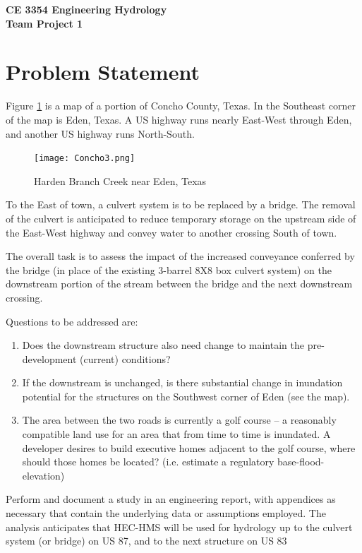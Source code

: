 \documentclass[12pt]{article}
\begin{document}
\begin{center}
{\textbf{{ CE 3354 Engineering Hydrology} \\ {Team Project 1}}}
\end{center}

\section*{\small{Problem Statement}}
Figure \ref{fig:Concho3} is a map of a portion of Concho County, Texas.  In the Southeast corner of the map is Eden, Texas.  A US highway runs nearly East-West through Eden, and another US highway runs North-South.
\begin{figure}[h!] %
   \centering
   \texttt{[image: Concho3.png]} 
   \caption{Harden Branch Creek near Eden, Texas}
   \label{fig:Concho3}
\end{figure}
To the East of town, a culvert system is to be replaced by a bridge.   The removal of the culvert is anticipated to reduce temporary storage on the upstream side of the East-West highway and convey water to another crossing South of town.  

The overall task is to assess the impact of the increased conveyance conferred by the bridge (in place of the existing 3-barrel 8X8 box culvert system) on the downstream portion of the stream between the bridge and the next downstream crossing.

Questions to be addressed are:
\begin{enumerate}
\item Does the downstream structure also need change to maintain the pre-development (current) conditions?
\item If the downstream is unchanged, is there substantial change in inundation potential for the structures on the Southwest corner of Eden (see the map).
\item The area between the two roads is currently a golf course – a reasonably compatible land use for an area that from time to time is inundated. A developer desires to build executive homes adjacent to the golf course, where should those homes be located? (i.e. estimate a regulatory base-flood-elevation)
\end{enumerate}

Perform and document a study in an engineering report, with appendices as necessary that contain the underlying data or assumptions employed. The analysis anticipates that HEC-HMS will be used for hydrology up to the culvert system (or bridge) on US 87, and to the next structure on US 83
\end{document}
